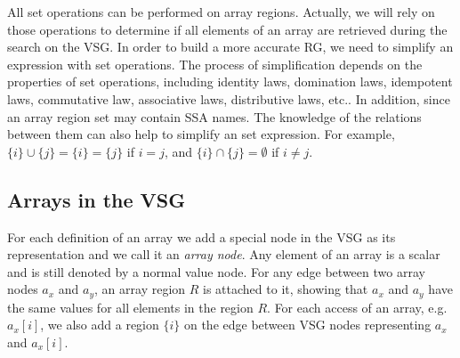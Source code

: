 \documentclass[12pt]{gatech-thesis}
\begin{document}
All set operations can be performed on array regions. Actually, we will rely on those operations to determine if all elements of an array are retrieved during the search on the VSG. 
In order to build a more accurate RG, we need to simplify an expression with set operations.
The process of simplification  depends on the properties of set operations, including identity laws, domination laws, idempotent laws, commutative law, associative laws, distributive laws, etc..
In addition, since an array region set may contain SSA names. 
The knowledge of the relations between them can also help to simplify an set expression.
For example, $\{i\} \cup \{j\} = \{i\} =\{j\}$ if $i=j$, and $\{i\} \cap \{j\} = \emptyset$ if $i\ne j$.


\subsection{Arrays in the VSG}

For each definition of an array we add a special node in the VSG as its representation and we call it an \emph{array node}. 
Any element of an array is a scalar and is still denoted by a normal value node. 
For any edge between two array nodes $a_x$ and $a_y$, an array region $R$ is attached to it, showing that $a_x$ and $a_y$ have the same values for all elements in the region $R$.
For each access of an array, e.g. $a_x[i]$, we also add a region $\{i\}$ on the edge between VSG nodes representing $a_x$ and $a_x[i]$.
\end{document}
